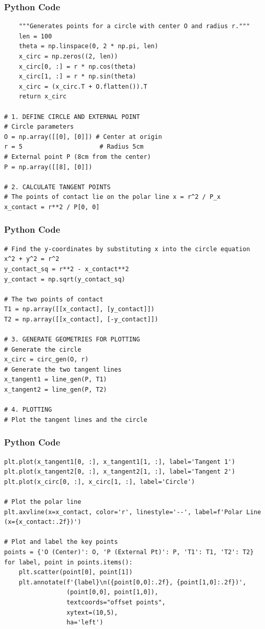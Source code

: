 \documentclass{beamer}
\begin{document}
\begin{frame}[fragile]
\frametitle{Python Code}
\begin{lstlisting}
    """Generates points for a circle with center O and radius r."""
    len = 100
    theta = np.linspace(0, 2 * np.pi, len)
    x_circ = np.zeros((2, len))
    x_circ[0, :] = r * np.cos(theta)
    x_circ[1, :] = r * np.sin(theta)
    x_circ = (x_circ.T + O.flatten()).T
    return x_circ

# 1. DEFINE CIRCLE AND EXTERNAL POINT
# Circle parameters
O = np.array([[0], [0]]) # Center at origin
r = 5                     # Radius 5cm
# External point P (8cm from the center)
P = np.array([[8], [0]])

# 2. CALCULATE TANGENT POINTS
# The points of contact lie on the polar line x = r^2 / P_x
x_contact = r**2 / P[0, 0]
\end{lstlisting}
\end{frame}
\begin{frame}[fragile]
\frametitle{Python Code}
\begin{lstlisting}
# Find the y-coordinates by substituting x into the circle equation x^2 + y^2 = r^2
y_contact_sq = r**2 - x_contact**2
y_contact = np.sqrt(y_contact_sq)

# The two points of contact
T1 = np.array([[x_contact], [y_contact]])
T2 = np.array([[x_contact], [-y_contact]])

# 3. GENERATE GEOMETRIES FOR PLOTTING
# Generate the circle
x_circ = circ_gen(O, r)
# Generate the two tangent lines
x_tangent1 = line_gen(P, T1)
x_tangent2 = line_gen(P, T2)

# 4. PLOTTING
# Plot the tangent lines and the circle
\end{lstlisting}
\end{frame}
\begin{frame}[fragile]
\frametitle{Python Code}
\begin{lstlisting}
plt.plot(x_tangent1[0, :], x_tangent1[1, :], label='Tangent 1')
plt.plot(x_tangent2[0, :], x_tangent2[1, :], label='Tangent 2')
plt.plot(x_circ[0, :], x_circ[1, :], label='Circle')

# Plot the polar line
plt.axvline(x=x_contact, color='r', linestyle='--', label=f'Polar Line (x={x_contact:.2f})')

# Plot and label the key points
points = {'O (Center)': O, 'P (External Pt)': P, 'T1': T1, 'T2': T2}
for label, point in points.items():
    plt.scatter(point[0], point[1])
    plt.annotate(f'{label}\n({point[0,0]:.2f}, {point[1,0]:.2f})',
                 (point[0,0], point[1,0]),
                 textcoords="offset points",
                 xytext=(10,5),
                 ha='left')
\end{lstlisting}
\end{frame}
\end{document}
